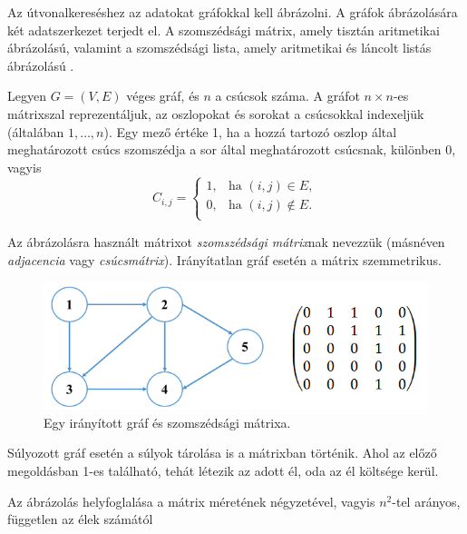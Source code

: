 

Az útvonalkereséshez az adatokat gráfokkal kell ábrázolni. A gráfok ábrázolására két adatszerkezet terjedt el. A szomszédsági mátrix, amely tisztán aritmetikai ábrázolású, valamint a szomszédsági lista, amely aritmetikai és láncolt listás ábrázolású \cite{grafabrazolas}.


Legyen $G = (V,E)$ véges gráf, és $n$ a csúcsok száma. A gráfot $n \times n$-es mátrixszal reprezentáljuk, az oszlopokat és sorokat a csúcsokkal indexeljük (általában $1, \ldots, n$). Egy mező értéke 1, ha a hozzá tartozó oszlop által meghatározott csúcs szomszédja a sor által meghatározott csúcsnak, különben 0, vagyis
$$
C_{i, j} = \begin{cases}
    1, & \text{ha } (i, j) \in E, \\
    0, & \text{ha } (i, j) \notin E. \\
\end{cases}
$$

Az ábrázolásra használt mátrixot \textit{szomszédsági mátrix}nak nevezzük (másnéven \textit{adjacencia} vagy \textit{csúcsmátrix}). Irányítatlan gráf esetén a mátrix szemmetrikus.


\begin{figure}[htb]
\centering
\includegraphics[scale=0.5]{kepek/szomszedsagi_graf_matrix.png}
\caption{Egy irányított gráf és szomszédsági mátrixa.}
\label{fig:szomszedsagi_graf_matrix}
\end{figure}

Súlyozott gráf esetén a súlyok tárolása is a mátrixban történik. Ahol az előző megoldásban 1-es található, tehát létezik az adott él, oda az él költsége kerül.

Az ábrázolás helyfoglalása a mátrix méretének négyzetével, vagyis $n^2$-tel arányos, független az élek számától

